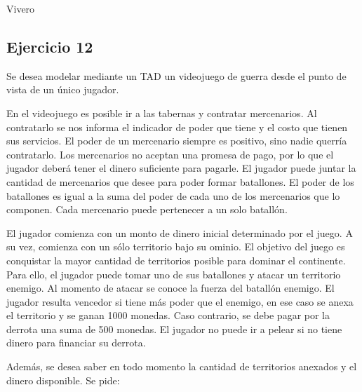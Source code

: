 \begin{tad}{Vivero}{}




\end{tad}

\subsection{Ejercicio 12}
Se desea modelar mediante un TAD un videojuego de guerra desde el punto de vista de un único jugador.

En el videojuego es posible ir a las tabernas y contratar mercenarios. Al contratarlo se nos informa el indicador de poder que tiene y el costo que tienen sus servicios. El poder de un mercenario siempre es positivo, sino nadie querría contratarlo. Los mercenarios no aceptan una promesa de pago, por lo que el jugador deberá tener el dinero suficiente para pagarle. El jugador puede juntar la cantidad de mercenarios que desee para poder formar batallones. El poder de los batallones es igual a la suma del poder de cada uno de los mercenarios que lo componen. Cada mercenario puede pertenecer a un solo batallón.

El jugador comienza con un monto de dinero inicial determinado por el juego. A su vez, comienza con un sólo territorio bajo su  ominio. El objetivo del juego es conquistar la mayor cantidad de territorios posible para dominar el continente. Para ello, el jugador puede tomar uno de sus batallones y atacar un territorio enemigo. Al momento de atacar se conoce la fuerza del batallón enemigo. El jugador resulta vencedor si tiene más poder que el enemigo, en ese caso se anexa el territorio y se ganan 1000 monedas. Caso contrario, se debe pagar por la derrota una suma de 500 monedas. El jugador no puede ir a pelear si no tiene dinero para financiar su derrota.

Además, se desea saber en todo momento la cantidad de territorios anexados y el dinero disponible.
Se pide:

